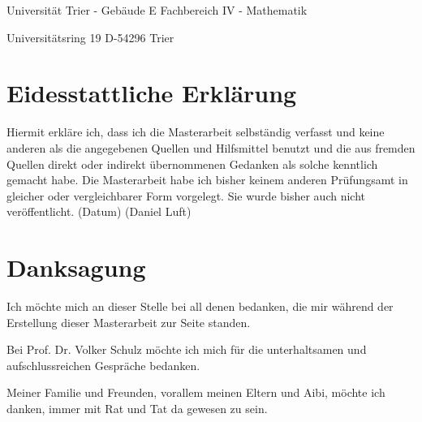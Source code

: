 \documentclass[bibliography=totoc,12pt,a4paper]{scrartcl}
\theoremstyle{exampstyle}
\numberwithin{equation}{section}
\begin{document}
\vspace{10cm}
Universität Trier - Gebäude E \newline
Fachbereich IV - Mathematik

Universitätsring 19 \newline
D-54296 Trier

\section*{Eidesstattliche Erklärung}
Hiermit erkläre ich, dass ich die Masterarbeit selbständig verfasst und keine anderen als die angegebenen Quellen und Hilfsmittel benutzt und die aus fremden Quellen direkt oder indirekt übernommenen
Gedanken als solche kenntlich gemacht habe. Die Masterarbeit habe ich bisher keinem anderen Prüfungsamt in gleicher oder vergleichbarer Form vorgelegt. Sie wurde bisher auch nicht veröffentlicht.
\vspace{1.5cm}
\newline
(Datum) \hspace{9cm} (Daniel Luft)



\newpage




\section*{Danksagung}

Ich möchte mich an dieser Stelle bei all denen bedanken, die mir während der Erstellung dieser Masterarbeit zur Seite standen. 
\newline

Bei Prof. Dr. Volker Schulz möchte ich mich für die unterhaltsamen und aufschlussreichen Gespräche bedanken. 
\newline 

Meiner Familie und Freunden, vorallem meinen Eltern und Aibi, möchte ich danken, immer mit Rat und Tat da gewesen zu sein.

\newpage

  \tableofcontents

\newpage

  \pagestyle{headings}
  
\end{document}
